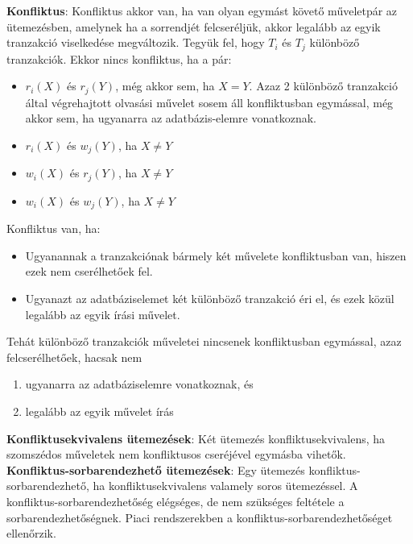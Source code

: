 \documentclass[margin=0px]{article}
\begin{document}
\noindent \textbf{Konfliktus}: Konfliktus akkor van, ha van olyan egymást követő műveletpár az ütemezésben, amelynek ha a sorrendjét felcseréljük, akkor legalább az egyik tranzakció viselkedése megváltozik. Tegyük fel, hogy $T_{i}$ és $T_{j}$ különböző tranzakciók.
Ekkor nincs konfliktus, ha a pár:
\begin{itemize}
    \item	 $r_{i}(X)$ és $r_{j}(Y)$, még akkor sem, ha $X = Y$. Azaz 2 különböző tranzakció által végrehajtott olvasási művelet
          sosem áll konfliktusban egymással, még akkor sem, ha ugyanarra az adatbázis-elemre vonatkoznak.

    \item	$r_{i}(X)$ és   $w_{j}(Y)$, ha $X \not = Y$

    \item	$w_{i}(X)$ és   $r_{j}(Y)$, ha $X \not = Y$

    \item	$w_{i}(X)$ és   $w_{j}(Y)$, ha $X \not = Y$
\end{itemize}

\noindent Konfliktus van, ha:
\begin{itemize}
    \item	Ugyanannak a tranzakciónak bármely két művelete konfliktusban van, hiszen ezek nem cserélhetőek fel.
    \item	Ugyanazt az adatbáziselemet két különböző tranzakció éri el, és ezek közül legalább az egyik írási művelet.
\end{itemize}

Tehát különböző tranzakciók műveletei nincsenek konfliktusban egymással, azaz felcserélhetőek, hacsak nem
\begin{enumerate}
    \item	ugyanarra az adatbáziselemre vonatkoznak, és
    \item	legalább az egyik művelet írás
\end{enumerate}

\noindent \textbf{Konfliktusekvivalens ütemezések}: Két ütemezés konfliktusekvivalens, ha szomszédos műveletek nem konfliktusos
cseréjével egymásba vihetők.\\

\noindent \textbf{Konfliktus-sorbarendezhető ütemezések}: Egy ütemezés konfliktus-sorbarendezhető, ha konfliktusekvivalens valamely
soros ütemezéssel. A konfliktus-sorbarendezhetőség elégséges, de nem szükséges feltétele a sorbarendezhetőségnek. Piaci rendszerekben
a konfliktus-sorbarendezhetőséget ellenőrzik.\\
\end{document}
